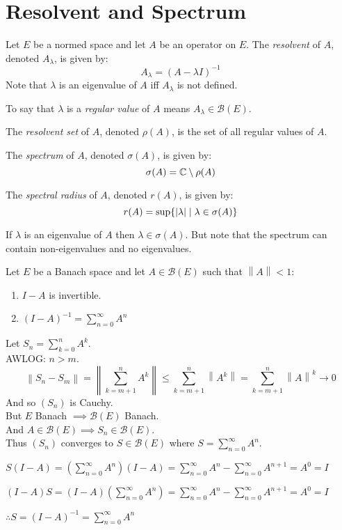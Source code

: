 \documentclass[letterpaper,12pt,fleqn]{article}
\renewcommand{\l}{\lambda}
\renewcommand{\o}{\sigma}
\newcommand{\p}{\rho}
\newcommand{\mb}{\mathcal{B}}
\newcommand{\norm}[1]{\left\|#1\right\|}
\begin{document}
\section*{Resolvent and Spectrum}

\begin{definition}
  Let $E$ be a normed space and let $A$ be an operator on $E$. The
  \emph{resolvent} of $A$, denoted $A_{\l}$, is given by:
  \[A_{\l}=(A-\l I)^{-1}\]
  Note that $\l$ is an eigenvalue of $A$ iff $A_{\l}$ is not defined.

  To say that $\l$ is a \emph{regular value} of $A$ means $A_{\l}\in\mb(E)$.

  The \emph{resolvent set} of $A$, denoted $\p(A)$, is the set of all regular
  values of $A$.

  The \emph{spectrum} of $A$, denoted $\o(A)$, is given by:
  \[\o(A)=\C\setminus\p(A)\]

  The \emph{spectral radius} of $A$, denoted $r(A)$, is given by:
  \[r(A)=\sup\{\abs{\l}\mid\l\in\o(A)\}\]
\end{definition}

If $\l$ is an eigenvalue of $A$ then $\l\in\o(A)$. But note that the spectrum
can contain non-eigenvalues and no eigenvalues.

\begin{lemma}
  Let $E$ be a Banach space and let $A\in\mb(E)$ such that $\norm{A}<1$:
  \begin{enumerate}
  \item $I-A$ is invertible.
  \item $(I-A)^{-1}=\sum_{n=0}^{\infty}A^n$
  \end{enumerate}
\end{lemma}

\begin{theproof}
  Let $S_n=\sum_{k=0}^nA^k$. \\
  AWLOG: $n>m$.
  \[\norm{S_n-S_m}=\norm{\sum_{k=m+1}^nA^k}\le\sum_{k=m+1}^n\norm{A^k}=
  \sum_{k=m+1}^n\norm{A}^k\to0\]
  And so $(S_n)$ is Cauchy. \\
  But $E$ Banach $\implies\mb(E)$ Banach. \\
  And $A\in\mb(E)\implies S_n\in\mb(E)$. \\
  Thus $(S_n)$ converges to $S\in\mb(E)$ where $S=\sum_{n=0}^{\infty}A^n$.

  $S(I-A)=\left(\sum_{n=0}^{\infty}A^n\right)(I-A)=
  \sum_{n=0}^{\infty}A^n-\sum_{n=0}^{\infty}A^{n+1}=A^0=I$

  $(I-A)S=(I-A)\left(\sum_{n=0}^{\infty}A^n\right)=
  \sum_{n=0}^{\infty}A^n-\sum_{n=0}^{\infty}A^{n+1}=A^0=I$

  $\therefore S=(I-A)^{-1}=\sum_{n=0}^{\infty}A^n$
\end{theproof}
\end{document}
